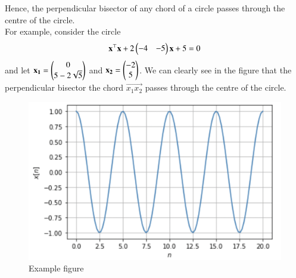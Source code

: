 \documentclass[journal,12pt,twocolumn]{IEEEtran}
\begin{document}
Hence, the perpendicular bisector of any chord of a circle passes through the centre of the circle.\\

For example, consider the circle
\begin{align}
    \mathbf{x}^\top\mathbf{x}+2\begin{pmatrix}-4&-5\end{pmatrix}\mathbf{x}+5=0
\end{align}
and let $\mathbf{x_1}=\begin{pmatrix}0\\5-2\sqrt{5}\end{pmatrix}$ and $\mathbf{x_2}=\begin{pmatrix}-2\\5\end{pmatrix}$.
We can clearly see in the figure that the perpendicular bisector the chord $\vec{x_1x_2}$ passes through the centre of the circle.

\begin{figure}[h!]
    \includegraphics[width=\columnwidth]{figure.png}
    \caption{Example figure}
\end{figure}
\end{document}
